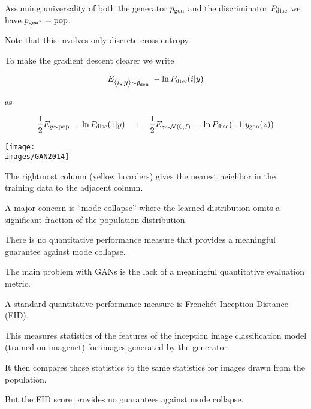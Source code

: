 {\vfill
Assuming universality of both the generator $p_{\mathrm{gen}}$ and the discriminator $P_{\mathrm{disc}}$ we have {\color{red} $p_{\mathrm{gen}^*} = \mathrm{pop}$}.

\vfill
Note that this involves only discrete cross-entropy.


To make the gradient descent clearer we write

\vfill
$$E_{{\mbox{$\langle i,y\rangle$}} \sim \tilde{p}_{\mathrm{gen}}}\;-\ln P_{\mathrm{disc}}(i|y)$$

\vfill
as

\vfill
$$\frac{1}{2} E_{y \sim \mathrm{pop}}\;-\ln P_{\mathrm{disc}}(1|y) \;\;\;+\;\;\; \frac{1}{2} E_{z \sim {\cal N}(0,I)}\;-\ln P_{\mathrm{disc}}(-1|y_{\mathrm{gen}}(z))$$

\centerline{\texttt{[image: \\images/GAN2014]}}
The rightmost column (yellow boarders) gives the nearest neighbor in the training data to the adjacent column.


A major concern is ``mode collapse'' where the learned distribution omits a significant fraction of the population distribution.

\vfill
There is no quantitative performance measure that provides a meaningful guarantee against mode collapse.


The main problem with GANs is the lack of a meaningful quantitative evaluation metric.

\vfill
A standard quantitative performance measure is French\'{e}t Inception Distance (FID).

\vfill
This measures statistics of the features
of the inception image classification model (trained on imagenet) for images generated by the generator.

\vfill
It then compares those statistics
to the same statistics for images drawn from the population.

\vfill
But the FID score provides no guarantees against mode collapse.


}


